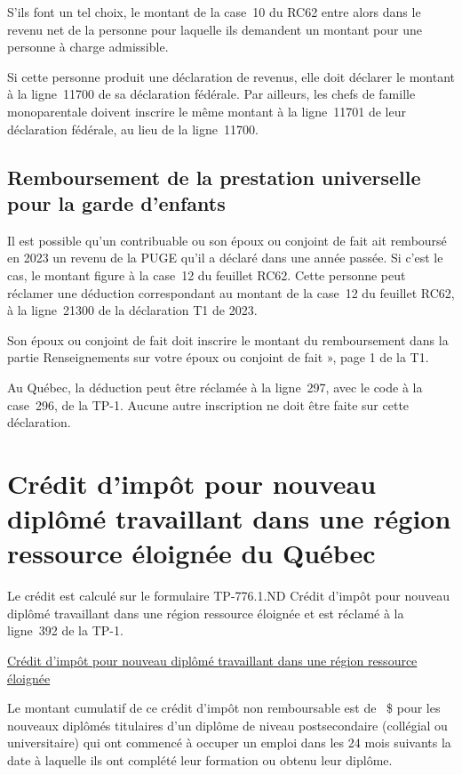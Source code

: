 S'ils font un tel choix, le montant de la case~10 du RC62 entre alors dans le revenu net de la personne pour laquelle ils demandent un montant pour une personne à charge admissible. 

Si cette personne produit une déclaration de revenus, elle doit déclarer le montant à la ligne~11700 de sa déclaration fédérale. Par ailleurs, les chefs de famille monoparentale doivent inscrire le même montant à la ligne~11701 de leur déclaration fédérale, au lieu de la ligne~11700.


\subsection{Remboursement de la prestation universelle pour la garde d'enfants}
Il est possible qu'un contribuable ou son époux ou conjoint de fait ait remboursé en 2023 un revenu de la PUGE qu'il a déclaré dans une année passée. Si c'est le cas, le montant figure à la case~12 du feuillet RC62. Cette personne peut réclamer une déduction correspondant au montant de la case~12 du feuillet RC62, à la ligne~21300 de la déclaration T1 de 2023.

Son époux ou conjoint de fait doit inscrire le montant du remboursement dans la partie \og Renseignements sur votre époux ou conjoint de fait », page 1 de la T1. 

Au Québec, la déduction peut être réclamée à la ligne~297, avec le code  \fg{} à la case~296, de la TP-1. Aucune autre inscription ne doit être faite sur cette déclaration.



\section{Crédit d'impôt pour nouveau diplômé travaillant dans une région ressource éloignée du Québec}
Le crédit est calculé sur le formulaire TP-776.1.ND Crédit d'impôt pour nouveau diplômé travaillant dans une région ressource éloignée et est réclamé à la ligne~392 de la TP-1.

\qct\href{https://www.revenuquebec.ca/fr/services-en-ligne/formulaires-et-publications/details-courant/tp-776-1-nd/}{Crédit d'impôt pour nouveau diplômé travaillant dans une région ressource éloignée }

Le montant cumulatif de ce crédit d'impôt non remboursable est de ~\$ pour les nouveaux diplômés titulaires d'un diplôme de niveau postsecondaire (collégial ou universitaire) qui ont commencé à occuper un emploi dans les 24 mois suivants la date à laquelle ils ont complété leur formation ou obtenu leur diplôme.

